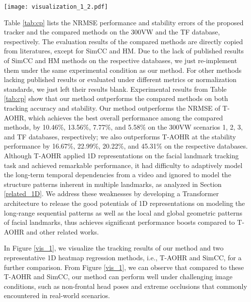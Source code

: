 \documentclass[review]{elsarticle}
\begin{document}
\begin{figure*}
	\centering
	\texttt{[image: visualization\_1\_2.pdf]}
	\caption{Visualization of the tracking results of different tracking methods, i.e., T-AOHR, SimCC, and our method. The three images in the left are video frames from 300VW S3, while the three images in the right are challenging video frames from movies.}
	\label{vis_1}
\end{figure*}

Table \ref{tab:cp} lists the NRMSE performance and stability errors of the proposed tracker and the compared methods on the 300VW and the TF database, respectively. The evaluation results of the compared methods are directly copied from literatures, except for SimCC and HM. Due to the lack of published results of SimCC and HM methods on the respective databases, we just re-implement them under the same experimental condition as our method.  For other methods lacking published results or evaluated under different metrics or normalization standards, we just left their results blank. Experimental results from Table \ref{tab:cp} show that our method outperforms the compared methods on both tracking accuracy and stability. Our method outperforms the NRMSE of T-AOHR, which achieves the best overall performance among the compared methods, by 10.46\%, 13.56\%, 7.77\%, and 5.58\% on the 300VW scenarios 1, 2, 3, and TF databases, respectively; we also outperforms T-AOHR at the stability performance by 16.67\%, 22.99\%, 20.22\%, and 45.31\% on the respective databases. Although T-AOHR applied 1D representations on the facial landmark tracking task and achieved remarkable performance, it had difficulty to adaptively model the long-term temporal dependencies from a video and ignored to model the structure patterns inherent in multiple landmarks, as analyzed in Section \ref{related_1D}. We address these weaknesses by developing a Transformer architecture to release the good potentials of 1D representations on modeling the long-range sequential  patterns as well as the local and global geometric patterns of facial landmarks, thus achieves significant performance boosts compared to T-AOHR and other related works. 

In Figure \ref{vis_1}, we visualize the tracking results of our method and two representative 1D heatmap regression methods, i.e., T-AOHR\cite{AOHR} and SimCC\cite{SimCC}, for a further comparison. From Figure \ref{vis_1}, we can observe that compared to these T-AOHR and SimCC, our method can perform well under challenging image conditions, such as non-frontal head poses and extreme occlusions that commonly encountered in real-world scenarios.
\end{document}
